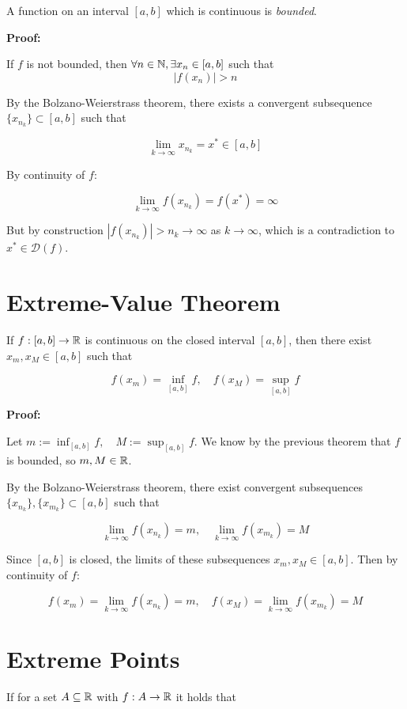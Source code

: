 A function on an interval \([a,b]\) which is continuous is \emph{bounded}.

\textbf{Proof:}

If \(f\) is not bounded, then \(\forall n \in \mathbb{N}, \exists x_n \in [a,b]\) such that
\[
    |f(x_n)| > n
\]

By the Bolzano-Weierstrass theorem, there exists a convergent subsequence \(\{x_{n_k}\} \subset [a,b]\) such that

\[
    \lim_{k \to \infty} x_{n_k} = x^* \in [a,b]
\]

By continuity of \(f\):

\[
    \lim_{k \to \infty} f(x_{n_k}) = f(x^*) = \infty
\]

But by construction \(|f(x_{n_k})| > n_k \to \infty\) as \(k \to \infty\), which is a contradiction to 
\(x^* \in \mathcal{D}(f)\).

\QED

\section{Extreme-Value Theorem}

If \(f: [a, b] \to \mathbb{R}\) is continuous on the closed interval \([a, b]\), then there exist \(x_m, x_M \in [a,b]\) such that 

\[
    f(x_m) = \inf_{[a,b]} f, \quad f(x_M) = \sup_{[a,b]} f
\]

\textbf{Proof:}

Let \(m := \inf_{[a,b]} f, \quad M := \sup_{[a,b]} f\). We know by the previous theorem that \(f\) is bounded, so \(m, M \in \mathbb{R}\).

By the Bolzano-Weierstrass theorem, there exist convergent subsequences \(\{x_{n_k}\}, \{x_{m_k}\} \subset [a,b]\) such that

\[
    \lim_{k \to \infty} f(x_{n_k}) = m, \quad \lim_{k \to \infty} f(x_{m_k}) = M
\]

Since \([a,b]\) is closed, the limits of these subsequences \(x_m, x_M \in [a,b]\).  Then by continuity of \(f\):

\[
    f(x_m) = \lim_{k \to \infty} f(x_{n_k}) = m, \quad f(x_M) = \lim_{k \to \infty} f(x_{m_k}) = M
\]

\QED

\section{Extreme Points}

If for a set \(A \subseteq \mathbb{R}\) with \(f : A \to \mathbb{R}\) it holds that 

